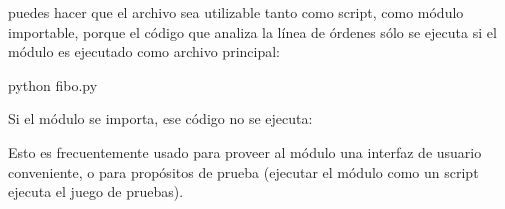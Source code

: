 \documentclass[a5paper,10pt,spanish]{sphinxmanual}
\begin{document}
\sphinxAtStartPar
puedes hacer que el archivo sea utilizable tanto como script, como módulo importable, porque el código que analiza la línea de órdenes sólo se ejecuta si el módulo es ejecutado como archivo principal:

\begin{sphinxVerbatim}[commandchars=\\\{\}]
 python fibo.py 
\end{sphinxVerbatim}

\sphinxAtStartPar
Si el módulo se importa, ese código no se ejecuta:

\begin{sphinxVerbatim}[commandchars=\\\{\}]
 
\end{sphinxVerbatim}

\sphinxAtStartPar
Esto es frecuentemente usado para proveer al módulo una interfaz de usuario conveniente, o para propósitos de prueba (ejecutar el módulo como un script ejecuta el juego de pruebas).
\end{document}
